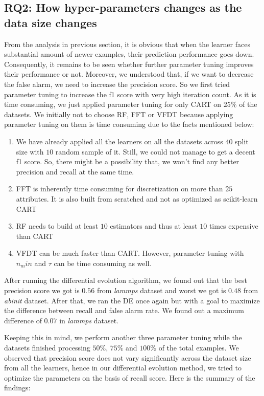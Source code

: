 \documentclass[sigplan]{acmart}\settopmatter{printfolios=true,printccs=false,printacmref=false}
\begin{document}
\subsection{RQ2: How hyper-parameters changes as the data size changes}
From the analysis in previous section, it is obvious that when the learner faces substantial amount of newer examples, their prediction performance goes down. Consequently, it remains to be seen whether further parameter tuning improves their performance or not. Moreover, we understood that, if we want to decrease the false alarm, we need to increase the precision score. So we first tried parameter tuning to increase the f1 score with very high iteration count. As it is time consuming, we just applied parameter tuning for only CART on $25\%$ of the datasets. We initially not to choose RF, FFT or VFDT because applying parameter tuning on them is time consuming due to the facts mentioned below:

\begin{enumerate}
	\item We have already applied all the learners on all the datasets across $40$ split size with $10$ random sample of it. Still, we could not manage to get a decent f1 score. So, there might be a possibility that, we won't find any better precision and recall at the same time. 
	\item FFT is inherently time consuming for discretization on more than $25$ attributes. It is also built from scratched and not as optimized as scikit-learn CART
	\item RF needs to build at least $10$ estimators and thus at least $10$ times expensive than CART
	\item VFDT can be much faster than CART. However, parameter tuning with $n_min$ and $\tau$ can be time consuming as well.
\end{enumerate} 

After running the differential evolution algorithm, we found out that the best precision score we got is $0.56$ from \textit{lammps} dataset and worst we got is $0.48$ from \textit{abinit} dataset. After that, we ran the DE once again but with a goal to maximize the difference between recall and false alarm rate. We found out a maximum difference of $0.07$ in \textit{lammps} dataset.

Keeping this in mind, we perform another three parameter tuning while the datasets finished processing $50\%$, $75\%$ and $100\%$ of the total examples. We observed that precision score does not vary significantly across the dataset size from all the learners, hence in our differential evolution method, we tried to optimize the parameters on the basis of recall score. Here is the summary of the findings:
\end{document}
